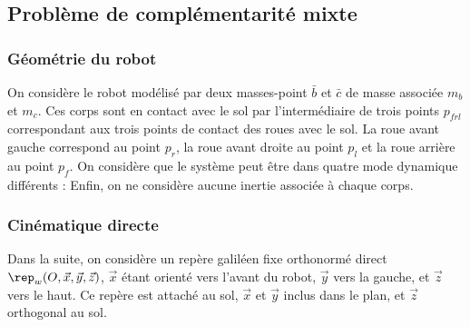 		\subsection{Problème de complémentarité mixte}
		
			\subsubsection{Géométrie du robot}
			
				On considère le robot modélisé par deux masses-point $\bar{b}$ et $\bar{c}$ de masse associée $m_b$ et $m_c$. 
				Ces corps sont en contact avec le sol par l'intermédiaire de trois points $p_{frl}$ correspondant aux trois points de contact des roues avec le sol.
				La roue avant gauche correspond au point $p_r$, la roue avant droite au point $p_l$ et la roue arrière au point $p_f$.
				On considère que le système peut être dans quatre mode dynamique différents :
				Enfin, on ne considère aucune inertie associée à chaque corps. 
		
			\subsubsection{Cinématique directe}
			
			
				Dans la suite, on considère un repère galiléen fixe orthonormé direct $\rep_w(O, \vec{x},\vec{y},\vec{z})$, $\vec{x}$ étant orienté vers l'avant du robot, $\vec{y}$ vers la gauche, et $\vec{z}$ vers le haut. 
				Ce repère est attaché au sol, $\vec{x}$ et $\vec{y}$ inclus dans le plan, et $\vec{z}$ orthogonal au sol. 
				
